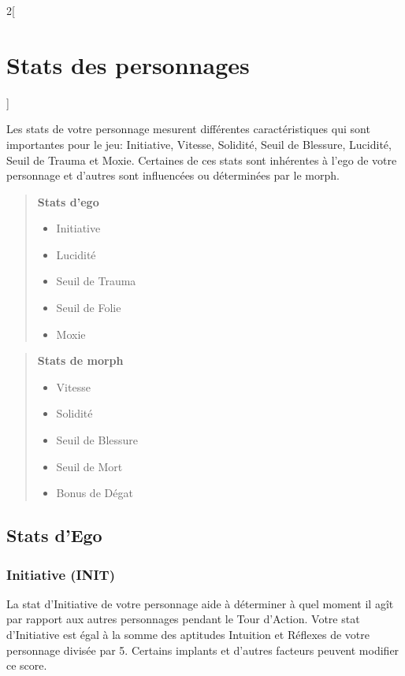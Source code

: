 \documentclass[a4paper,9pt]{article}
\begin{document}
\begin{multicols}{2}[\section{Stats des personnages} \label{sec:character-stats}]

Les stats de votre personnage mesurent différentes caractéristiques qui sont
importantes pour le jeu: Initiative, Vitesse, Solidité, Seuil de Blessure,
Lucidité, Seuil de Trauma et Moxie. Certaines de ces stats sont inhérentes à
l'ego de votre personnage et d'autres sont influencées ou déterminées par le
morph. 

\begin{quotation}
\textbf{Stats d'ego}
\begin{itemize}
\item Initiative
\item Lucidité
\item Seuil de Trauma
\item Seuil de Folie
\item Moxie
\end{itemize}
\end{quotation} 

\begin{quotation}
\textbf{Stats de morph}
\begin{itemize} 
\item Vitesse
\item Solidité
\item Seuil de Blessure
\item Seuil de Mort
\item Bonus de Dégat
\end{itemize}
\end{quotation} 

\subsection{Stats d'Ego}

\subsubsection{Initiative (INIT)} \label{sec:initiative-init} 

La stat d'Initiative de votre personnage aide à déterminer à quel moment il
agît par rapport aux autres personnages pendant le Tour d'Action. Votre stat
d'Initiative est égal à la somme des aptitudes Intuition et Réflexes de votre
personnage divisée par 5. Certains implants et d'autres facteurs peuvent
modifier ce score. 


\end{multicols}
\end{document}
